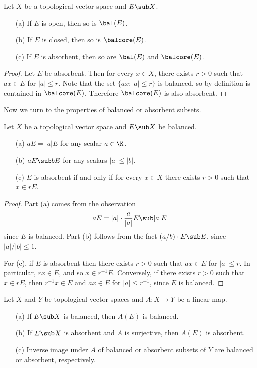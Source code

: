 \begin{corollary}\label{TVS balanced hull and core of closed open}
Let $X$ be a topological vector space and $E\sub X$.
\begin{itemize}
\item[(a)] If $E$ is open, then so is $\bal(E)$.
\item[(b)] If $E$ is closed, then so is $\balcore(E)$.
\item[(c)] If $E$ is absorbent, then so are $\bal(E)$ and $\balcore(E)$.
\end{itemize}
\end{corollary}
\begin{proof}
Let $E$ be absorbent. Then for every $x\in X$, there exists $r>0$ such that $ax\in E$ for $|a|\leq r$. Note that the set $\{ax:|a|\leq r\}$ is balanced, so by definition is contained in $\balcore(E)$. Therefore $\balcore(E)$ is also absorbent.
\end{proof}
Now we turn to the properties of balanced or absorbent subsets.
\begin{proposition}\label{TVS balanced set prop}
Let $X$ be a topological vector space and $E\sub X$ be balanced.
\begin{itemize}
\item[(a)] $aE=|a|E$ for any scalar $a\in\K$.
\item[(b)] $aE\sub bE$ for any scalars $|a|\leq|b|$.
\item[(c)] $E$ is absorbent if and only if for every $x\in X$ there exists $r>0$ such that $x\in rE$.
\end{itemize}
\end{proposition}
\begin{proof}
Part (a) comes from the observation
\[aE=|a|\cdot\frac{a}{|a|}E\sub|a|E\]
since $E$ is balanced. Part (b) follows from the fact $(a/b)\cdot E\sub E$, since $|a|/|b|\leq 1$.\par
For (c), if $E$ is absorbent then there exists $r>0$ such that $ax\in E$ for $|a|\leq r$. In particular, $rx\in E$, and so $x\in r^{-1}E$. Conversely, if there exists $r>0$ such that $x\in rE$, then $r^{-1}x\in E$ and $ax\in E$ for $|a|\leq r^{-1}$, since $E$ is balanced.
\end{proof}
\begin{proposition}\label{TVS balanced and absorbent under linear map}
Let $X$ and $Y$ be topological vector spaces and $A:X\to Y$ be a linear map.
\begin{itemize}
\item[(a)] If $E\sub X$ is balanced, then $A(E)$ is balanced.
\item[(b)] If $E\sub X$ is absorbent and $A$ is surjective, then $A(E)$ is absorbent.
\item[(c)] Inverse image under $A$ of balanced or absorbent subsets of $Y$ are balanced or absorbent, respectively. 
\end{itemize}
\end{proposition}
